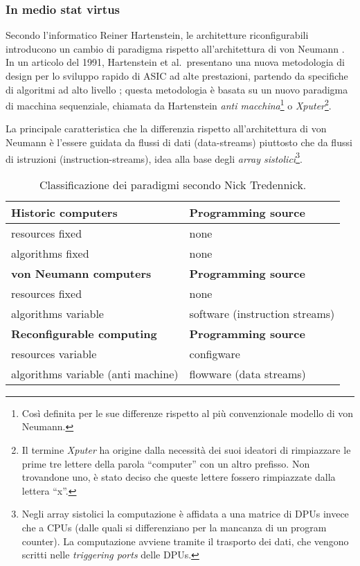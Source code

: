 \subsubsection{In medio stat virtus}
Secondo l'informatico Reiner Hartenstein, le architetture riconfigurabili introducono un
cambio di paradigma rispetto all'architettura di von Neumann
\cite{HartensteinParadigmShift}. In un articolo del 1991, Hartenstein et al.~presentano
una nuova metodologia di design per lo sviluppo rapido di \ac{ASIC} ad alte prestazioni,
partendo da specifiche di algoritmi ad alto livello \cite{HartensteinNovelASICDesign};
questa metodologia è basata su un nuovo paradigma di macchina sequenziale, chiamata da
Hartenstein \emph{anti macchina}\footnote{Così definita per le sue differenze rispetto al
più convenzionale modello di von Neumann.} o \emph{Xputer}\footnote{Il termine
\emph{Xputer} ha origine dalla necessità dei suoi ideatori di rimpiazzare le prime tre
lettere della parola ``computer'' con un altro prefisso. Non trovandone uno, è stato
deciso che queste lettere fossero rimpiazzate dalla lettera ``x''.}.

La principale caratteristica che la differenzia rispetto all'architettura di von Neumann è
l'essere guidata da flussi di dati (data-streams) piuttosto che da flussi di istruzioni
(instruction-streams), idea alla base degli \emph{array sistolici}\footnote{Negli array
sistolici la computazione è affidata a una matrice di \acp{DPU} invece che a \acsp{CPU}
(dalle quali si differenziano per la mancanza di un program counter). La computazione
avviene tramite il trasporto dei dati, che vengono scritti nelle \emph{triggering ports}
delle \acp{DPU}.}.

\begin{table}[ht]
\begin{center}
 \begin{tabular}{l | l}
 \hline
 \textbf{Historic computers} & \textbf{Programming source}\\
 \hline
 resources fixed & none\\
 algorithms fixed & none\\
 \hline
 \textbf{von Neumann computers} & \textbf{Programming source}\\
 \hline
 resources fixed & none\\
 algorithms variable & software (instruction streams)\\
 \hline
 \textbf{Reconfigurable computing} & \textbf{Programming source}\\
 \hline
 resources variable & configware\\
 algorithms variable (anti machine) & flowware (data streams)
 \end{tabular}
 \caption{Classificazione dei paradigmi secondo Nick Tredennick.}
 \label{tab:TredennickClassificationScheme}
 \end{center}
\end{table}

